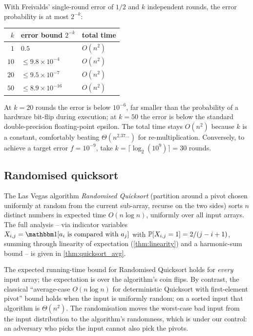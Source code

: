 \begin{example}
\label{ex:amplification_numbers}
With Freivalds' single-round error of $1/2$ and $k$ independent rounds, the error probability is at most $2^{-k}$:
\begin{center}
\begin{tabular}{rll}
\toprule
$k$ & error bound $2^{-k}$ & total time \\
\midrule
$1$  & $0.5$                       & $O(n^2)$ \\
$10$ & $\le 9.8 \times 10^{-4}$    & $O(n^2)$ \\
$20$ & $\le 9.5 \times 10^{-7}$    & $O(n^2)$ \\
$50$ & $\le 8.9 \times 10^{-16}$   & $O(n^2)$ \\
\bottomrule
\end{tabular}
\end{center}
At $k = 20$ rounds the error is below $10^{-6}$, far smaller than the probability of a hardware bit-flip during execution; at $k = 50$ the error is below the standard double-precision floating-point epsilon. The total time stays $O(n^2)$ because $k$ is a constant, comfortably beating $\Theta(n^{2.37\dots})$ for re-multiplication. Conversely, to achieve a target error $f = 10^{-9}$, take $k = \lceil \log_2(10^9) \rceil = 30$ rounds.
\end{example}

\subsection{Randomised quicksort}

\begin{proposition}
\label{prop:randomised_quicksort}
The Las Vegas algorithm \emph{Randomised Quicksort} (partition around a pivot chosen uniformly at random from the current sub-array, recurse on the two sides) sorts $n$ distinct numbers in expected time $O(n \log n)$, uniformly over all input arrays. The full analysis -- via indicator variables $X_{i,j} = \indic[a_i \text{ is compared with } a_j]$ with $\operatorname{\mathbb{P}}[X_{i,j} = 1] = 2/(j - i + 1)$, summing through linearity of expectation (\cref{thm:linearity}) and a harmonic-sum bound -- is given in \cref{thm:quicksort_avg}.
\end{proposition}

\begin{remark}
The expected running-time bound for Randomised Quicksort holds for \emph{every} input array; the expectation is over the algorithm's coin flips. By contrast, the classical ``average-case $O(n \log n)$ for deterministic Quicksort with first-element pivot'' bound holds when the input is uniformly random; on a sorted input that algorithm is $\Theta(n^2)$. The randomisation moves the worst-case bad input from the input distribution to the algorithm's randomness, which is under our control: an adversary who picks the input cannot also pick the pivots.
\end{remark}

